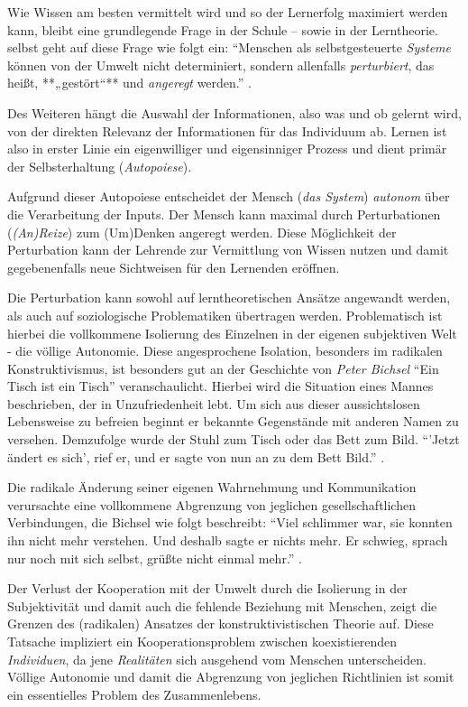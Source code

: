 Wie Wissen am besten vermittelt wird und so der Lernerfolg maximiert werden kann, bleibt eine grundlegende Frage in der Schule -- sowie in der Lerntheorie.
\citeauthor{siebert-2003}  selbst geht auf diese Frage wie folgt ein:
``Menschen als selbstgesteuerte \emph{Systeme} können von der Umwelt nicht determiniert, sondern allenfalls \emph{perturbiert}, das heißt, **„gestört“** und \emph{angeregt} werden.'' \citep[vgl.][5]{siebert-2003}.

Des Weiteren hängt die Auswahl der Informationen, also was und ob gelernt wird, von der direkten Relevanz der Informationen für das Individuum ab.
Lernen ist also in erster Linie ein eigenwilliger und eigensinniger Prozess und dient primär der Selbsterhaltung (\emph{Autopoiese}).

Aufgrund dieser Autopoiese entscheidet der Mensch (\emph{das System}) \emph{autonom} über die Verarbeitung der Inputs.
Der Mensch kann maximal durch Perturbationen (\emph{(An)Reize}) zum (Um)Denken angeregt werden.
Diese Möglichkeit der Perturbation kann der Lehrende zur Vermittlung von Wissen nutzen und damit gegebenenfalls neue Sichtweisen für den Lernenden eröffnen.

Die Perturbation kann sowohl auf lerntheoretischen Ansätze angewandt werden, als auch auf soziologische Problematiken übertragen werden.
Problematisch ist hierbei die vollkommene Isolierung des Einzelnen in der eigenen subjektiven Welt - die völlige Autonomie.
Diese angesprochene Isolation, besonders im radikalen Konstruktivismus, ist besonders gut an der Geschichte von \emph{Peter Bichsel} ``Ein Tisch ist ein Tisch'' veranschaulicht.
Hierbei wird die Situation eines Mannes beschrieben, der in Unzufriedenheit lebt.
Um sich aus dieser aussichtslosen Lebensweise zu befreien beginnt er bekannte Gegenstände mit anderen Namen zu versehen.
Demzufolge wurde der Stuhl zum Tisch oder das Bett zum Bild.
``'Jetzt ändert es sich', rief er, und er sagte von nun an zu dem Bett Bild.'' \citep[vgl.][18]{bichsel-1990}.

Die radikale Änderung seiner eigenen Wahrnehmung und Kommunikation verursachte eine vollkommene Abgrenzung von jeglichen gesellschaftlichen Verbindungen, die Bichsel wie folgt beschreibt:
``Viel schlimmer war, sie konnten ihn nicht mehr verstehen. Und deshalb sagte er nichts mehr. Er schwieg, sprach nur noch mit sich selbst, grüßte nicht einmal mehr.'' \citep[vgl.][25]{bichsel-1990}.

Der Verlust der Kooperation mit der Umwelt durch die Isolierung in der Subjektivität und damit auch die fehlende Beziehung mit Menschen, zeigt die Grenzen des (radikalen) Ansatzes der konstruktivistischen Theorie auf.
Diese Tatsache impliziert ein Kooperationsproblem zwischen koexistierenden \emph{Individuen}, da jene \emph{Realitäten} sich ausgehend vom Menschen unterscheiden.
Völlige Autonomie und damit die Abgrenzung von jeglichen Richtlinien ist somit ein essentielles Problem des Zusammenlebens.
